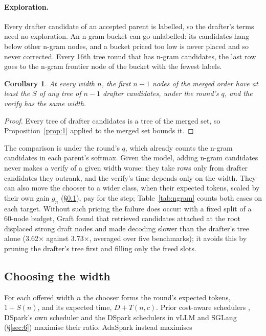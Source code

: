\documentclass[10pt,twocolumn,letterpaper]{article}
\newtheorem{corollary}[proposition]{Corollary}
\begin{document}
\paragraph{Exploration.} Every drafter candidate of an accepted parent is labelled, so the drafter's terms need no exploration. An n-gram bucket can go unlabelled: its candidates hang below other n-gram nodes, and a bucket priced too low is never placed and so never corrected. Every 16th tree round that has n-gram candidates, the last row goes to the n-gram frontier node of the bucket with the fewest labels.

\begin{corollary}\label{prop:4}
At every width $n$, the first $n-1$ nodes of the merged order have at least the $S$ of any tree of $n-1$ drafter candidates, under the round's $q$, and the verify has the same width.
\end{corollary}

\begin{proof}
Every tree of drafter candidates is a tree of the merged set, so Proposition~\ref{prop:1} applied to the merged set bounds it.
\end{proof}

The comparison is under the round's $q$, which already counts the n-gram candidates in each parent's softmax. Given the model, adding n-gram candidates never makes a verify of a given width worse: they take rows only from drafter candidates they outrank, and the verify's time depends only on the width. They can also move the chooser to a wider class, when their expected tokens, scaled by their own gain $g_{n}$ (\S\ref{sec:3.4}), pay for the step; Table~\ref{tab:ngram} counts both cases on each target. Without such pricing the failure does occur: with a fixed split of a 60-node budget, Graft \cite{shen2026draft} found that retrieved candidates attached at the root displaced strong draft nodes and made decoding slower than the drafter's tree alone (3.62$\times$ against 3.73$\times$, averaged over five benchmarks); it avoids this by pruning the drafter's tree first and filling only the freed slots.

\subsection{Choosing the width}\label{sec:3.4}

For each offered width $n$ the chooser forms the round's expected tokens, $1 + S(n)$, and its expected time, $D + T(n, c)$. Prior cost-aware schedulers \cite{hong2026inference,pan2026making,oh2026bastion,liu2024turbospec}, DSpark's own scheduler \cite{cheng2026dspark} and the DSpark schedulers in vLLM and SGLang (\S\ref{sec:6}) maximise their ratio. AdaSpark instead maximises
\end{document}
